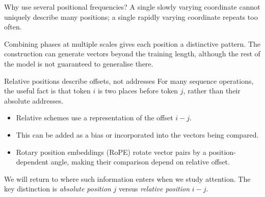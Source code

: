 \begin{frame}{Why use several positional frequencies?}
  A single slowly varying coordinate cannot uniquely describe many positions;
  a single rapidly varying coordinate repeats too often.

  \begin{center}
  \end{center}

  Combining phases at multiple scales gives each position a distinctive pattern.
  The construction can generate vectors beyond the training length, although the
  rest of the model is not guaranteed to generalise there.
\end{frame}

\begin{frame}{Relative positions describe offsets, not addresses}
  For many sequence operations, the useful fact is that token $i$ is two places
  before token $j$, rather than their absolute addresses.

  \begin{itemize}
    \item Relative schemes use a representation of the offset $i-j$.
    \item This can be added as a bias or incorporated into the vectors being
      compared.
    \item Rotary position embeddings (RoPE) rotate vector pairs by a
      position-dependent angle, making their comparison depend on relative offset.
  \end{itemize}

  We will return to where such information enters when we study attention. The
  key distinction is \emph{absolute position} $j$ versus \emph{relative position}
  $i-j$.
\end{frame}


